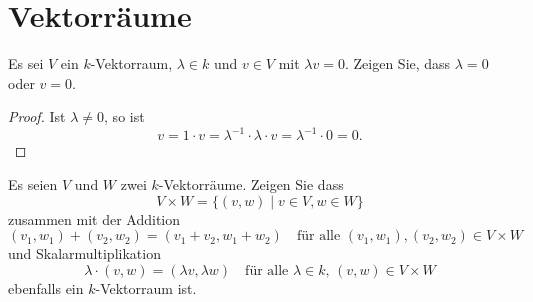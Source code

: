 \section{Vektorräume}


\begin{question}
 Es sei $V$ ein $k$-Vektorraum, $\lambda \in k$ und $v \in V$ mit $\lambda v = 0$. Zeigen Sie, dass $\lambda = 0$ oder $v = 0$.
\end{question}
\begin{proof}
 Ist $\lambda \neq 0$, so ist
 \[
  v = 1 \cdot v = \lambda^{-1} \cdot \lambda \cdot v = \lambda^{-1} \cdot 0 = 0.
 \]
\end{proof}




\begin{question}
 Es seien $V$ und $W$ zwei $k$-Vektorräume. Zeigen Sie dass
 \[
  V \times W = \{(v,w) \mid v \in V, w \in W\}
 \]
 zusammen mit der Addition
 \[
  (v_1,w_1) + (v_2,w_2) = (v_1+v_2, w_1+w_2)
  \quad \text{für alle $(v_1, w_1), (v_2, w_2) \in V \times W$}
 \]
 und Skalarmultiplikation
 \[
  \lambda \cdot (v,w) = (\lambda v, \lambda w)
  \quad \text{für alle $\lambda \in k$, $(v,w) \in V \times W$}
 \]
 ebenfalls ein $k$-Vektorraum ist.
\end{question}
